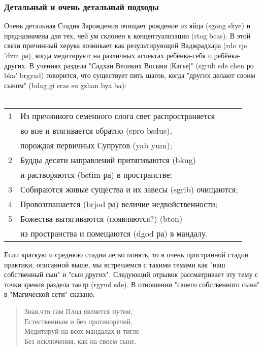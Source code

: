 \newpage
\subsubsection{Детальный и очень детальный подходы}
\vspace{1cm}
Очень детальная Стадия Зарождения очищает рождение из яйца (sgong skye) и
предназначена для тех, чей ум склонен к концептуализации (rtog bcas). В этой связи
причинный херука возникает как результирующий Ваджрадхара (rdo rje 'dzin ра), когда
медитируют на различных аспектах ребёнка-себя и ребёнка-других. В учениях раздела
"Садхан Великих Восьми [Кагье]" (sgrub sde chen ро bka' brgyad) говорится, что существует
пять шагов, когда "других делают своим сыном" (bdag gi sras su gzhan bya ba):\\
\\
\begin{tabular}{ll}
1 & Из причинного семенного слога свет распространяется \\
  & во вне и втягивается обратно (spro bsdus), \\
  & порождая первичных Супругов (yab yum);\\
2 & Будды десяти направлений притягиваются (bkug) \\
  & и растворяются (bstim ра) в пространстве;\\
3 & Собираются живые существа и их завесы (sgrib) очищаются;\\
4 & Провозглашается (brjod ра) величие недвойственности;\\
5 & Божества вытягиваются (появляются?) (bton) \\
  & из пространства и помещаются (dgod ра) в мандалу.\\
\end{tabular}

\begin{siderules}
Если краткую и среднюю стадии легко понять, то в очень пространной стадии практики,
описанной выше, мы встречаемся с такими темами как "наш собственный сын" и "сын
других". Следующий отрывок рассматривает эту тему с точки зрения раздела тантр
(rgyud sde). В отношении "своего собственного сына" в "Магической сети" сказано:
\begin{verse}
Зная,что сам Плод является путем,\\
Естественным и без противоречий,\\
Медитируй на всех мандалах и тигле\\
Без исключения, как на своем сыне.\\
\end{verse}
\end{siderules}

